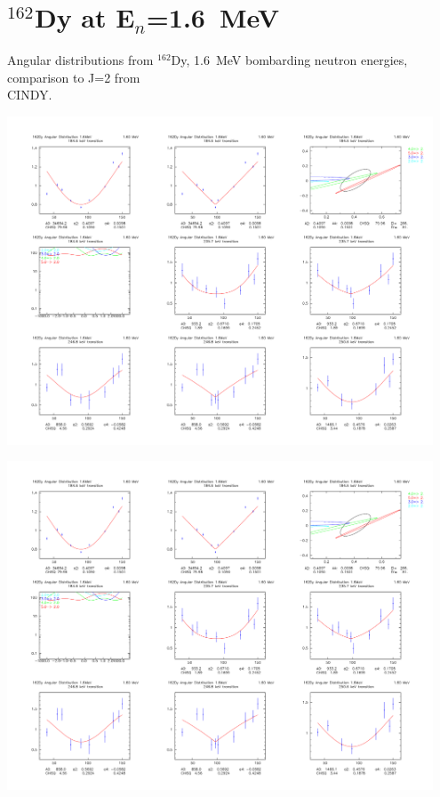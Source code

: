 \section{$^{162}$Dy at E$_n$=1.6~MeV}\label{app:AD_Dy_16}
Angular distributions from $^{162}$Dy, 1.6~MeV bombarding neutron energies, comparison to J=2 from {\\ CINDY}.
\begin{center}
\includegraphics[page=1,angle=90,width=0.95\textwidth]{162Dy_adlegpol_16_2.pdf}
\end{center}
\begin{center}
\includegraphics[page=2,angle=90,width=0.95\textwidth]{162Dy_adlegpol_16_2.pdf}
\end{center}
